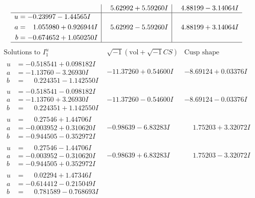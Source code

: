 \documentclass[1p]{elsarticle_modified}
\theoremstyle{definition}
\newcommand{\I}{\sqrt{-1}}
\begin{document}
$$\begin{array}{c|c|c}
 & \phantom{-}5.62992 + 5.59260 I & \phantom{-}4.88199 - 3.14064 I \\ \hline\begin{aligned}
u &= -0.23997 - 1.44565 I \\
a &= \phantom{-}1.055980 + 0.926944 I \\
b &= -0.674652 + 1.050250 I\end{aligned}
 & \phantom{-}5.62992 - 5.59260 I & \phantom{-}4.88199 + 3.14064 I\\
 \hline 
 \end{array}$$\newpage$$\begin{array}{c|c|c}  
\text{Solutions to }I^u_{1}& \I (\text{vol} + \sqrt{-1}CS) & \text{Cusp shape}\\
 \hline 
\begin{aligned}
u &= -0.518541 + 0.098182 I \\
a &= -1.13760 - 3.26930 I \\
b &= \phantom{-}0.224351 - 1.142550 I\end{aligned}
 & -11.37260 + 0.54600 I & -8.69124 + 0.03376 I \\ \hline\begin{aligned}
u &= -0.518541 - 0.098182 I \\
a &= -1.13760 + 3.26930 I \\
b &= \phantom{-}0.224351 + 1.142550 I\end{aligned}
 & -11.37260 - 0.54600 I & -8.69124 - 0.03376 I \\ \hline\begin{aligned}
u &= \phantom{-}0.27546 + 1.44706 I \\
a &= -0.003952 + 0.310620 I \\
b &= -0.944505 - 0.352972 I\end{aligned}
 & -0.98639 - 6.83283 I & \phantom{-}1.75203 + 3.32072 I \\ \hline\begin{aligned}
u &= \phantom{-}0.27546 - 1.44706 I \\
a &= -0.003952 - 0.310620 I \\
b &= -0.944505 + 0.352972 I\end{aligned}
 & -0.98639 + 6.83283 I & \phantom{-}1.75203 - 3.32072 I \\ \hline\begin{aligned}
u &= \phantom{-}0.02294 + 1.47346 I \\
a &= -0.614412 - 0.215049 I \\
b &= \phantom{-}0.781589 - 0.768693 I\end{aligned}

\end{array}$$
\end{document}
